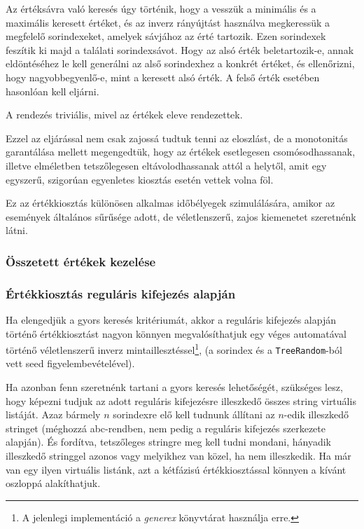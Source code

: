 \documentclass[
    parspace,
    noindent,
    nohyp,
]{elteiktdk}[2023/04/10]
\begin{document}
Az értéksávra való keresés úgy történik, hogy a vesszük a minimális és a maximális keresett értéket,
és az inverz rányújtást használva megkeressük a megfelelő sorindexeket, amelyek sávjához az érté tartozik.
Ezen sorindexek feszítik ki majd a találati sorindexsávot.
Hogy az alsó érték beletartozik-e, annak eldöntéséhez le kell generálni
az alső sorindexhez a konkrét értéket, és ellenőrizni, hogy nagyobbegyenlő-e,
mint a keresett alsó érték.
A felső érték esetében hasonlóan kell eljárni.

A rendezés triviális, mivel az értékek eleve rendezettek.

Ezzel az eljárással nem csak zajossá tudtuk tenni az eloszlást,
de a monotonitás garantálása mellett megengedtük,
hogy az értékek esetlegesen csomósodhassanak,
illetve elméletben tetszőlegesen eltávolodhassanak attól a helytől,
amit egy egyszerű, szigorúan egyenletes kiosztás esetén vettek volna föl.

Ez az értékkiosztás különösen alkalmas időbélyegek szimulálására,
amikor az események általános sűrűsége adott,
de véletlenszerű, zajos kiemenetet szeretnénk látni.

\subsubsection{Összetett értékek kezelése}

\subsubsection{Értékkiosztás reguláris kifejezés alapján}

Ha elengedjük a gyors keresés kritériumát,
akkor a reguláris kifejezés alapján történő értékkiosztást nagyon könnyen megvalósíthatjuk
egy véges automatával történő véletlenszerű inverz mintaillesztéssel\footnote{
  A jelenlegi implementáció a \textit{generex} könyvtárat használja erre.
},
(a sorindex és a \texttt{TreeRandom}-ból vett seed figyelembevételével).

Ha azonban fenn szeretnénk tartani a gyors keresés lehetőségét,
szükséges lesz, hogy képezni tudjuk az adott reguláris kifejezésre illeszkedő összes string virtuális listáját.
Azaz bármely $n$ sorindexre elő kell tudnunk állítani az $n$-edik illeszkedő stringet
(méghozzá abc-rendben, nem pedig a reguláris kifejezés szerkezete alapján).
És fordítva, tetszőleges stringre meg kell tudni mondani,
hányadik illeszkedő stringgel azonos vagy melyikhez van közel, ha nem illeszkedik.
Ha már van egy ilyen virtuális listánk, azt a kétfázisú értékkiosztással könnyen a kívánt oszloppá alakíthatjuk.
\end{document}
